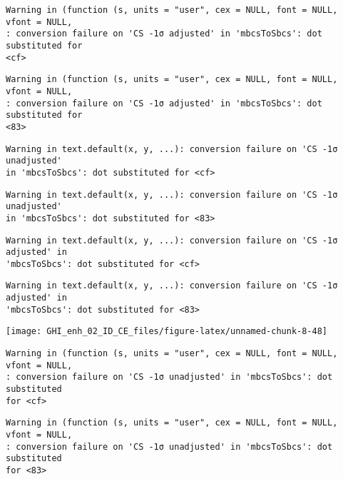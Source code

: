 \documentclass[
  10pt,
  a4paper,oneside]{article}
\begin{document}
\begin{verbatim}
Warning in (function (s, units = "user", cex = NULL, font = NULL, vfont = NULL,
: conversion failure on 'CS -1σ adjusted' in 'mbcsToSbcs': dot substituted for
<cf>
\end{verbatim}

\begin{verbatim}
Warning in (function (s, units = "user", cex = NULL, font = NULL, vfont = NULL,
: conversion failure on 'CS -1σ adjusted' in 'mbcsToSbcs': dot substituted for
<83>
\end{verbatim}

\begin{verbatim}
Warning in text.default(x, y, ...): conversion failure on 'CS -1σ unadjusted'
in 'mbcsToSbcs': dot substituted for <cf>
\end{verbatim}

\begin{verbatim}
Warning in text.default(x, y, ...): conversion failure on 'CS -1σ unadjusted'
in 'mbcsToSbcs': dot substituted for <83>
\end{verbatim}

\begin{verbatim}
Warning in text.default(x, y, ...): conversion failure on 'CS -1σ adjusted' in
'mbcsToSbcs': dot substituted for <cf>
\end{verbatim}

\begin{verbatim}
Warning in text.default(x, y, ...): conversion failure on 'CS -1σ adjusted' in
'mbcsToSbcs': dot substituted for <83>
\end{verbatim}

\begin{center}\texttt{[image: GHI\_enh\_02\_ID\_CE\_files/figure-latex/unnamed-chunk-8-48]} \end{center}

\begin{verbatim}
Warning in (function (s, units = "user", cex = NULL, font = NULL, vfont = NULL,
: conversion failure on 'CS -1σ unadjusted' in 'mbcsToSbcs': dot substituted
for <cf>
\end{verbatim}

\begin{verbatim}
Warning in (function (s, units = "user", cex = NULL, font = NULL, vfont = NULL,
: conversion failure on 'CS -1σ unadjusted' in 'mbcsToSbcs': dot substituted
for <83>
\end{verbatim}
\end{document}
